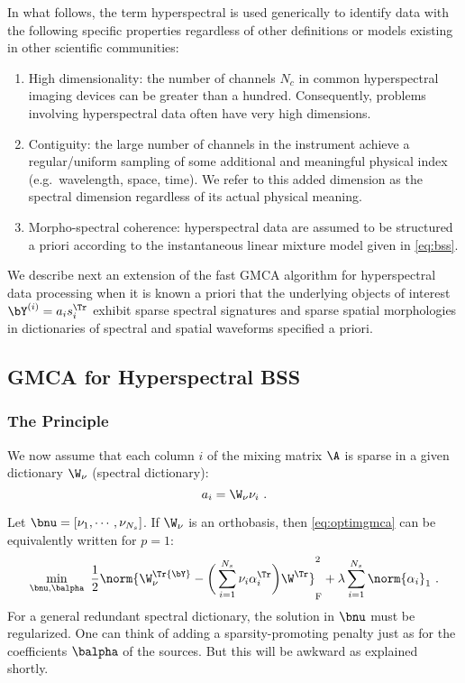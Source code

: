 In what follows, the term hyperspectral is used generically to identify data with the following specific properties regardless of other definitions or models existing in other scientific communities:   
\begin{enumerate}
\item High dimensionality: the number of channels $N_c$ in common hyperspectral imaging devices can be greater than a hundred. Consequently, problems involving hyperspectral data often have very high dimensions.
\item Contiguity: the large number of channels in the instrument achieve a regular/uniform sampling of some additional and meaningful physical index (e.g.\ wavelength, space, time). We refer to this added dimension as the spectral dimension regardless of its actual physical meaning.
\item Morpho-spectral coherence: hyperspectral data are assumed to be structured a priori according to the instantaneous linear mixture model given in \eqref{eq:bss}.
\end{enumerate}
We describe next an extension of the fast GMCA algorithm for hyperspectral data processing when it is known a priori that the underlying objects of interest ${\bY^{(i)}} = a_i s_i^\Tr$ exhibit sparse spectral signatures and sparse spatial morphologies in dictionaries of spectral and spatial waveforms specified a priori. 

\subsection{GMCA for Hyperspectral BSS}
\subsubsection{The Principle}

We now assume that each column $i$ of the mixing matrix $\A$ is sparse in a given dictionary ${\W_\nu}$ (spectral dictionary):
\begin{equation}
a_i = {\W_\nu} \nu_i ~.
\end{equation} 

Let $\bnu=[\nu_1,\cdots,\nu_{N_s}]$. If ${\W_\nu}$ is an orthobasis, then \eqref{eq:optimgmca} can be equivalently written for $p=1$:
\begin{equation}
\min_{\bnu,\balpha} ~ \frac{1}{2}\norm{\W_\nu^\Tr{\bY} -  \bigg(\sum_{i=1}^{N_s} {\nu}_i{\alpha}_i^\Tr\bigg)\W^\Tr}_\mathrm{F}^2 + \lambda\sum_{i=1}^{N_s} \norm{\alpha_{i}}_{1} ~.
\end{equation}
For a general redundant spectral dictionary, the solution in $\bnu$ must be regularized. One can think of adding a sparsity-promoting penalty just as for the coefficients $\balpha$ of the sources. But this will be awkward as explained shortly.
 
